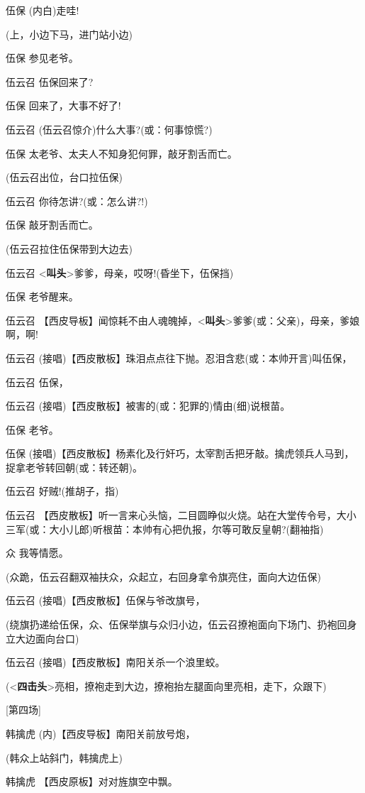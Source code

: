 伍保 (内白)走哇!

(上，小边下马，进门站小边)

伍保 参见老爷。

伍云召 伍保回来了?

伍保 回来了，大事不好了!

伍云召 (伍云召惊介)什么大事?(或：何事惊慌?)

伍保 太老爷、太夫人不知身犯何罪，敲牙割舌而亡。

(伍云召出位，台口拉伍保)

伍云召 你待怎讲?(或：怎么讲?!)

伍保 敲牙割舌而亡。

(伍云召拉住伍保带到大边去)

伍云召
\textless{}\textbf{叫头}\textgreater{}爹爹，母亲，哎呀!(昏坐下，伍保挡)

伍保 老爷醒来。

伍云召
【西皮导板】闻惊耗不由人魂魄掉，\textless{}\textbf{叫头}\textgreater{}爹爹(或：父亲)，母亲，爹娘啊，啊!

伍云召 (接唱)【西皮散板】珠泪点点往下抛。忍泪含悲(或：本帅开言)叫伍保，

伍云召 伍保，

伍云召 (接唱)【西皮散板】被害的(或：犯罪的)情由(细)说根苗。

伍保 老爷。

伍保
(接唱)【西皮散板】杨素化及行奸巧，太宰割舌把牙敲。擒虎领兵人马到，捉拿老爷转回朝(或：转还朝)。

伍云召 好贼!(推胡子，指)

伍云召
【西皮散板】听一言来心头恼，二目圆睁似火烧。站在大堂传令号，大小三军(或：大小儿郎)听根苗：本帅有心把仇报，尔等可敢反皇朝?(翻袖指)

众 我等情愿。

(众跪，伍云召翻双袖扶众，众起立，右回身拿令旗亮住，面向大边伍保)

伍云召 (接唱)【西皮散板】伍保与爷改旗号，

(绕旗扔递给伍保，众、伍保举旗与众归小边，伍云召撩袍面向下场门、扔袍回身立大边面向台口)

伍云召 (接唱)【西皮散板】南阳关杀一个浪里蛟。

(\textless{}\textbf{四击头}\textgreater{}亮相，撩袍走到大边，撩袍抬左腿面向里亮相，走下，众跟下)

{[}第四场{]}

韩擒虎 (内)【西皮导板】南阳关前放号炮，

(韩众上站斜门，韩擒虎上)

韩擒虎 【西皮原板】对对旌旗空中飘。

